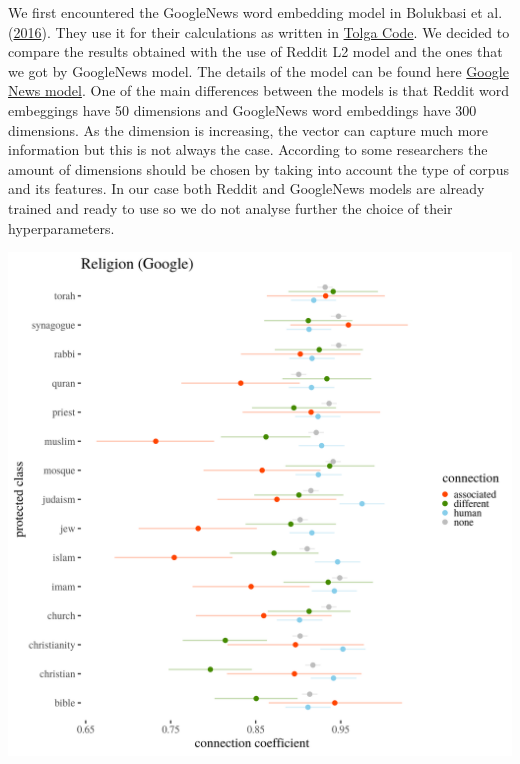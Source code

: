 \documentclass[12pt,]{book}
\begin{document}
We first encountered the GoogleNews word embedding model in Bolukbasi et
al. (\protect\hyperlink{ref-Bolukbasi2016Man}{2016}). They use it for
their calculations as written in
\href{https://github.com/tolga-b/debiaswe}{Tolga Code}. We decided to
compare the results obtained with the use of Reddit L2 model and the
ones that we got by GoogleNews model. The details of the model can be
found here \href{https://code.google.com/archive/p/word2vec/}{Google
News model}. One of the main differences between the models is that
Reddit word embeggings have 50 dimensions and GoogleNews word embeddings
have 300 dimensions. As the dimension is increasing, the vector can
capture much more information but this is not always the case. According
to some researchers the amount of dimensions should be chosen by taking
into account the type of corpus and its features. In our case both
Reddit and GoogleNews models are already trained and ready to use so we
do not analyse further the choice of their hyperparameters.

\includegraphics[width=14cm]{../images/visReligionGoogle.png}
\end{document}
